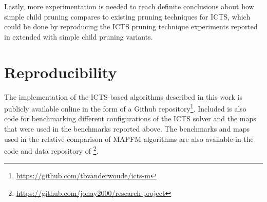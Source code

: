 \documentclass[english]{article}
\begin{document}
	Lastly, more experimentation is needed to reach definite conclusions about how simple child pruning compares to existing pruning techniques for ICTS, which could be done by reproducing the ICTS pruning technique experiments reported in \cite{sharon2011} extended with simple child pruning variants. %
	
	\section{Reproducibility}
	The implementation of the ICTS-based algorithms described in this work is publicly available online in the form of a Github repository\footnote{\url{https://github.com/tbvanderwoude/icts-m}}. Included is also code for benchmarking different configurations of the ICTS solver and the maps that were used in the benchmarks reported above. The benchmarks and maps used in the relative comparison of MAPFM algorithms are also available in the code and data repository of \cite{donszelmann2021}\footnote{\url{https://github.com/jonay2000/research-project}}.
	
\end{document}
